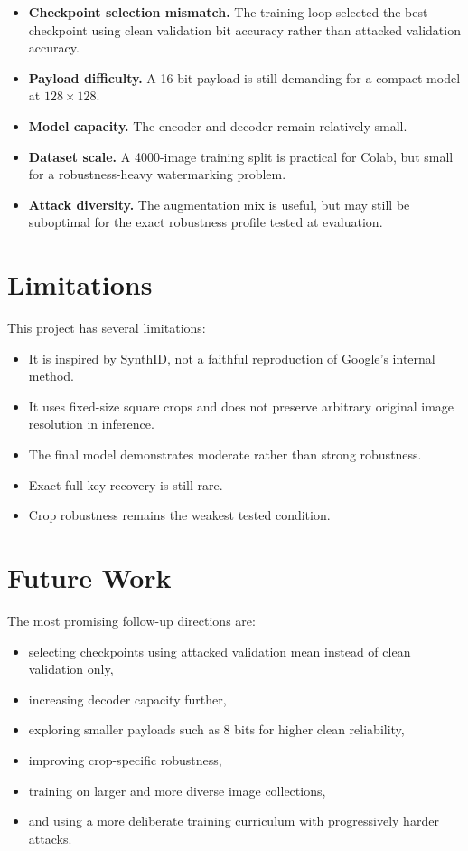 \documentclass[11pt]{article}
\begin{document}
\begin{itemize}[leftmargin=1.5em]
  \item \textbf{Checkpoint selection mismatch.} The training loop selected the best checkpoint using clean validation bit accuracy rather than attacked validation accuracy.
  \item \textbf{Payload difficulty.} A 16-bit payload is still demanding for a compact model at $128 \times 128$.
  \item \textbf{Model capacity.} The encoder and decoder remain relatively small.
  \item \textbf{Dataset scale.} A 4000-image training split is practical for Colab, but small for a robustness-heavy watermarking problem.
  \item \textbf{Attack diversity.} The augmentation mix is useful, but may still be suboptimal for the exact robustness profile tested at evaluation.
\end{itemize}

\section{Limitations}
This project has several limitations:

\begin{itemize}[leftmargin=1.5em]
  \item It is inspired by SynthID, not a faithful reproduction of Google's internal method.
  \item It uses fixed-size square crops and does not preserve arbitrary original image resolution in inference.
  \item The final model demonstrates moderate rather than strong robustness.
  \item Exact full-key recovery is still rare.
  \item Crop robustness remains the weakest tested condition.
\end{itemize}

\section{Future Work}
The most promising follow-up directions are:

\begin{itemize}[leftmargin=1.5em]
  \item selecting checkpoints using attacked validation mean instead of clean validation only,
  \item increasing decoder capacity further,
  \item exploring smaller payloads such as 8 bits for higher clean reliability,
  \item improving crop-specific robustness,
  \item training on larger and more diverse image collections,
  \item and using a more deliberate training curriculum with progressively harder attacks.
\end{itemize}
\end{document}
